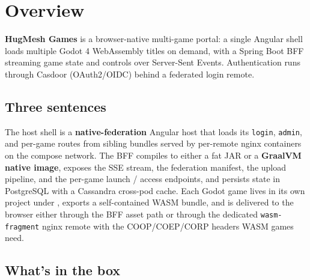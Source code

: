 \chapter{Overview}

\textbf{HugMesh Games} is a browser-native multi-game portal: a single
Angular shell loads multiple Godot 4 WebAssembly titles on demand, with a
Spring Boot BFF streaming game state and controls over Server-Sent Events.
Authentication runs through Casdoor (OAuth2/OIDC) behind a federated login
remote.

\section{Three sentences}

The host shell is a \textbf{native-federation} Angular host that loads its
\texttt{login}, \texttt{admin}, and per-game routes from sibling bundles
served by per-remote nginx containers on the compose network. The BFF
compiles to either a fat JAR or a \textbf{GraalVM native image}, exposes
the SSE stream, the federation manifest, the upload pipeline, and the
per-game launch / access endpoints, and persists state in PostgreSQL with
a Cassandra cross-pod cache. Each Godot game lives in its own project
under , exports a self-contained WASM bundle, and
is delivered to the browser either through the BFF asset path or through
the dedicated \texttt{wasm-fragment} nginx remote with the
COOP/COEP/CORP headers WASM games need.

\section{What's in the box}

